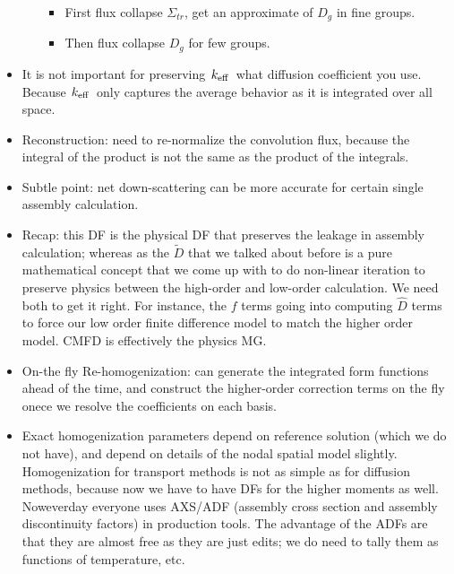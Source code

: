 \documentclass{school-22.211-notes}
\begin{document}
\begin{itemize}
\begin{enumerate}
      \begin{itemize}
        \item First flux collapse $\Sigma_{tr}$, get an approximate of $D_g$ in fine groups. 
        \item Then flux collapse $D_g$ for few groups.
      \end{itemize}
  \end{enumerate}

\item It is not important for preserving $\left. k_{\mathrm{eff}} \right.$ what diffusion coefficient you use. Because $\left. k_{\mathrm{eff}} \right.$ only captures the average behavior as it is integrated over all space. 

\item Reconstruction: need to re-normalize the convolution flux, because the integral of the product is not the same as the product of the integrals. 

\item Subtle point: net down-scattering can be more accurate for certain single assembly calculation. 

\item Recap: this DF is the physical DF that preserves the leakage in assembly calculation; whereas as the $\tilde{D}$ that we talked about before is a pure mathematical concept that we come up with to do non-linear iteration to preserve physics between the high-order and low-order calculation. We need both to get it right. For instance, the $f$ terms going into computing $\hat{D}$ terms to force our low order finite difference model to match the higher order model. CMFD is effectively the physics MG. 

\item On-the fly Re-homogenization: can generate the integrated form functions ahead of the time, and construct the higher-order correction terms on the fly onece we resolve the coefficients on each basis. 

\item Exact homogenization parameters depend on reference solution (which we do not have), and depend on details of the nodal spatial model slightly. Homogenization for transport methods is not as simple as for diffusion methods, because now we have to have DFs for the higher moments as well. Noweverday everyone uses AXS/ADF (assembly cross section and assembly discontinuity factors) in production tools. The advantage of the ADFs are that they are almost free as they are just edits; we do need to tally them as functions of temperature, etc. 
\end{itemize}
\end{document}
